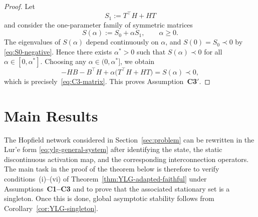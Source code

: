 \documentclass[journal]{IEEEtran}
\newtheorem{remark}{Remark}
\newtheorem{proof}{Proof}
\begin{document}
\begin{proof}
Let
\[
  S_1 := T^{\top}H + HT
\]
and consider the one-parameter family of symmetric matrices
\[
  S(\alpha) := S_0 + \alpha S_1,
  \qquad \alpha\ge 0.
\]
The eigenvalues of $S(\alpha)$ depend continuously on $\alpha$, and
$S(0)=S_0\prec 0$ by \eqref{eq:S0-negative}.  Hence there exists
$\alpha^\ast>0$ such that $S(\alpha)\prec 0$ for all
$\alpha\in[0,\alpha^\ast]$.  Choosing any
$\alpha\in(0,\alpha^\ast]$, we obtain
\[
  -HB - B^{\top}H + \alpha\bigl(T^{\top}H + HT\bigr)
  = S(\alpha) \prec 0 ,
\]
which is precisely~\eqref{eq:C3-matrix}.  This proves
Assumption~\textbf{C3$'$}.
\end{proof}


\section{Main Results}\label{sec:main}

The Hopfield network considered in Section~\ref{sec:problem} can be rewritten
in the Lur'e form \eqref{eq:ylg-general-system} after identifying the state,
the static discontinuous activation map, and the corresponding interconnection
operators. The main task in the proof of the theorem below is therefore to
verify conditions~(i)--(vi) of Theorem~\ref{thm:YLG-adapted-faithful} under
Assumptions~\textbf{C1--C3} and to prove that the associated stationary set is a
singleton. Once this is done, global asymptotic stability follows from
Corollary~\ref{cor:YLG-singleton}.
\end{document}
